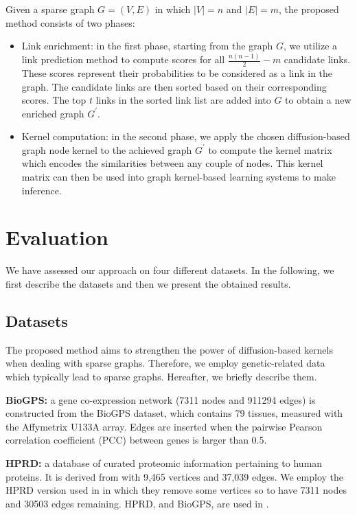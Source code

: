 \documentclass[runningheads,a4paper]{llncs}
\begin{document}
Given a sparse graph $G=(V, E)$ in which $|V| = n$ and $|E| = m$, the proposed method consists of two phases:
\begin{itemize}
\item Link enrichment: in the first phase, starting from the graph $G$, we utilize a link prediction method to compute scores for all $\frac{n(n-1)}{2}-m$ candidate links. These scores represent  their probabilities to be considered as a link in the graph. The candidate links are then sorted based on their corresponding scores. The top $t$ links in the sorted link list are added into $G$ to obtain a new enriched graph $G^{'}$.
\item Kernel computation: in the second phase, we apply the chosen diffusion-based graph node kernel to the achieved graph $G^{'}$ to compute the kernel matrix which encodes the similarities between any couple of nodes. This kernel matrix can then  be used into graph kernel-based learning systems to make inference.
\end{itemize}
\section{Evaluation}
\label{evaluation}
We have assessed our approach on four different datasets. In the following, we first describe the datasets and then we present the obtained results.
\subsection{Datasets}
The proposed method aims to strengthen the power of diffusion-based kernels when dealing with sparse graphs. Therefore, we employ  genetic-related data which typically lead to sparse graphs. Hereafter, we briefly describe them.

\textbf{BioGPS:} a gene co-expression network (7311 nodes and 911294 edges) is constructed from the BioGPS dataset, which contains 79 tissues, measured with the Affymetrix U133A array. Edges are inserted when the pairwise Pearson correlation coefficient (PCC) between genes is larger than 0.5.

\textbf{HPRD:} a database of curated proteomic information pertaining to human proteins. It is derived from \cite{jour5} with 9,465 vertices and 37,039 edges. We employ the HPRD version used in \cite{jour6} in which they remove some vertices so to have 7311 nodes and 30503 edges remaining. HPRD, and  BioGPS, are used in \cite{proceeding3}.
\end{document}
